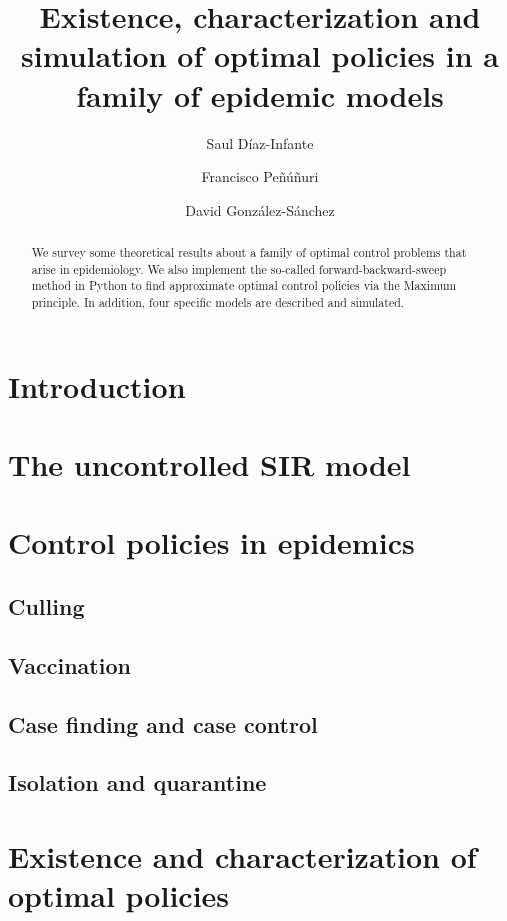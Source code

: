 \documentclass[11pt]{amsart}
\title[%
	Optimal policies in a family of epidemic models%
	]{
	Existence, characterization and simulation of optimal policies in a family of epidemic 
  models
}
\author[S. D\'iaz-Infante]{Saul D\'iaz-Infante}
\author[F. Pe\~nu\~n\'{u}ri]{Francisco Pe\~n\'u\~nuri}
\author[D. Gonz\'alez-S\'anchez]{David Gonz\'alez-S\'anchez}
\theoremstyle{definition}
\numberwithin{equation}{section}
\begin{document}
  \begin{abstract}
    We survey some theoretical results about a family of optimal 
    control problems that arise in epidemiology. We also implement the
    so-called forward-backward-sweep method in Python to find approximate
    optimal control policies via the Maximum principle. In addition,
    four specific models are described and simulated.  
  \end{abstract}
\maketitle
%
  \section{Introduction}
    
  \section{The uncontrolled SIR model}
    
  \section{Control policies in epidemics}
    
    \subsection{Culling}
      
    \subsection{Vaccination}
      
    \subsection{Case finding and case control}
      
    \subsection{Isolation and quarantine}
      
%
  \section{Existence and characterization of optimal policies}
    
%
\end{document}
